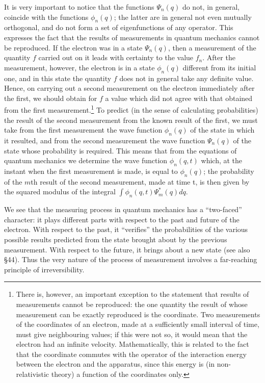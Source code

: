 It is very important to notice that the functions $ \Psi_n(q) $ do not, in general, coincide with the functions $ \phi_n(q) $; the latter are in general not even mutually orthogonal, and do not form a set of eigenfunctions of any operator. This expresses the fact that the results of measurements in quantum mechanics cannot be reproduced. If the electron was in a state $ \Psi_n(q) $, then a measurement of the quantity $ f $ carried out on it leads with certainty to the value $ f_n $. After the measurement, however, the electron is in a state $ \phi_n(q) $ different from its initial one, and in this state the quantity $ f $ does not in general take any definite value. Hence, on carrying out a second measurement on the electron immediately after the first, we should obtain for $ f $ a value which did not agree with that obtained from the first measurement.\footnote{There is, however, an important exception to the statement that results of measurements cannot be reproduced: the one quantity the result of whose measurement can be exactly reproduced is the coordinate. Two measurements of the coordinates of an electron, made at a sufficiently small interval of time, must give neighbouring values; if this were not so, it would mean that the electron had an infinite velocity. Mathematically, this is related to the fact that the coordinate commutes with the operator of the interaction energy between the electron and the apparatus, since this energy is (in non-relativistic theory) a function of the coordinates only.
} To predict (in the sense of calculating probabilities) the result of the second measurement from the known result of the first, we must take from the first measurement the wave function $ \phi_n(q) $ of the state in which it resulted, and from the second measurement the wave function $ \Psi_n(q) $ of the state whose probability is required. This means that from the equations of quantum mechanics we determine the wave function $ \phi_n(q,t) $ which, at the instant when the first measurement is made, is equal to $ \phi_n(q) $; the probability of the $ m $th result of the second measurement, made at time t, is then given by the squared modulus of the integral $ \int \phi_n(q, t)\Psi_m^* (q) dq $.
		
We see that the measuring process in quantum mechanics has a “two-faced” character: it plays different parts with respect to the past and future of the electron. With respect to the past, it “verifies” the probabilities of the various possible results predicted from the state brought about by the previous measurement. With respect to the future, it brings about a new state (see also §44). Thus the very nature of the process of measurement involves a far-reaching principle of irreversibility.
		
